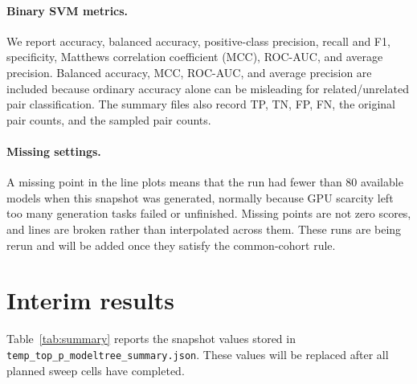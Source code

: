 \documentclass[11pt,a4paper]{article}
\begin{document}
\paragraph{Binary SVM metrics.}
We report accuracy, balanced accuracy, positive-class precision, recall and F1,
specificity, Matthews correlation coefficient (MCC), ROC-AUC, and average
precision.  Balanced accuracy, MCC, ROC-AUC, and average precision are included
because ordinary accuracy alone can be misleading for related/unrelated pair
classification.  The summary files also record TP, TN, FP, FN, the original
pair counts, and the sampled pair counts.

\paragraph{Missing settings.}
A missing point in the line plots means that the run had fewer than 80 available
models when this snapshot was generated, normally because GPU scarcity left too
many generation tasks failed or unfinished. Missing points are not zero scores,
and lines are broken rather than interpolated across them. These runs are being
rerun and will be added once they satisfy the common-cohort rule.

\section{Interim results}
Table~\ref{tab:summary} reports the snapshot values stored in
\texttt{temp\_top\_p\_modeltree\_summary.json}.  These values will be replaced
after all planned sweep cells have completed.
\end{document}
